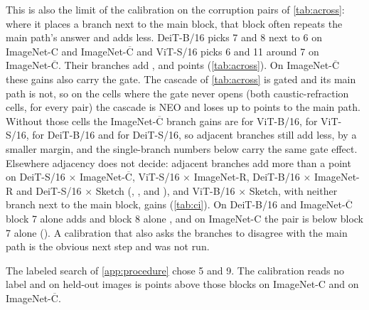 \documentclass{article}
\newcommand{\neo}{NEO}
\begin{document}
This is also the limit of the calibration on the corruption pairs of \cref{tab:across}: where it places a branch next to the main block, that block often repeats the main path's answer and adds less. DeiT-B/16 picks 7 and 8 next to 6 on ImageNet-C and ImageNet-$\overline{\text{C}}$ and ViT-S/16 picks 6 and 11 around 7 on ImageNet-$\overline{\text{C}}$. Their branches add ,  and  points (\cref{tab:across}). On ImageNet-$\overline{\text{C}}$ these gains also carry the gate. The cascade of \cref{tab:across} is gated and its main path is not, so on the cells where the gate never opens (both caustic-refraction cells, for every pair) the cascade is \neo{} and loses up to  points to the main path. Without those cells the ImageNet-$\overline{\text{C}}$ branch gains are  for ViT-B/16,  for ViT-S/16,  for DeiT-B/16 and  for DeiT-S/16, so adjacent branches still add less, by a smaller margin, and the single-branch numbers below carry the same gate effect. Elsewhere adjacency does not decide: adjacent branches add more than a point on DeiT-S/16 $\times$ ImageNet-$\overline{\text{C}}$, ViT-S/16 $\times$ ImageNet-R, DeiT-B/16 $\times$ ImageNet-R and DeiT-S/16 $\times$ Sketch (, ,  and ), and ViT-B/16 $\times$ Sketch, with neither branch next to the main block, gains  (\cref{tab:ci}). On DeiT-B/16 and ImageNet-$\overline{\text{C}}$ block 7 alone adds  and block 8 alone , and on ImageNet-C the pair is below block 7 alone (). A calibration that also asks the branches to disagree with the main path is the obvious next step and was not run.

The labeled search of \cref{app:procedure} chose 5 and 9. The calibration reads no label and on held-out images is  points above those blocks on ImageNet-C and  on ImageNet-$\overline{\text{C}}$.
\end{document}
